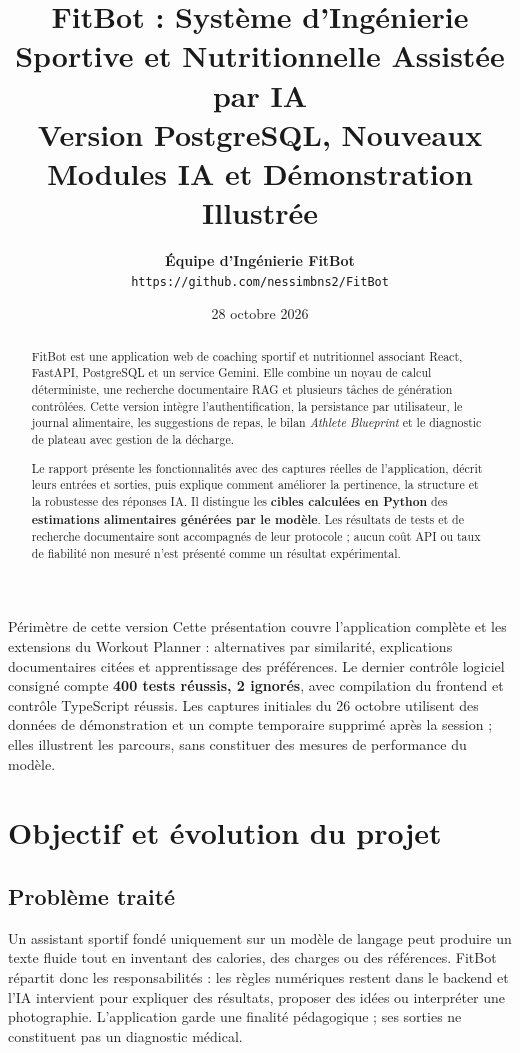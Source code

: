 \documentclass[11pt,a4paper]{article}
\title{
  \vspace{-1.0cm}
  {\Huge \textbf{\textsf{FitBot : Système d'Ingénierie Sportive et Nutritionnelle Assistée par IA}}} \\[0.5cm]
  {\Large \textbf{\textsf{Version PostgreSQL, Nouveaux Modules IA et Démonstration Illustrée}}} \\[0.7cm]
}
\author{
  \textbf{Équipe d'Ingénierie FitBot} \\
  \texttt{https://github.com/nessimbns2/FitBot}
}
\date{28 octobre 2026}
\begin{document}
\maketitle
\begin{abstract}
FitBot est une application web de coaching sportif et nutritionnel associant React, FastAPI, PostgreSQL et un service Gemini. Elle combine un noyau de calcul déterministe, une recherche documentaire RAG et plusieurs tâches de génération contrôlées. Cette version intègre l'authentification, la persistance par utilisateur, le journal alimentaire, les suggestions de repas, le bilan \textit{Athlete Blueprint} et le diagnostic de plateau avec gestion de la décharge.

Le rapport présente les fonctionnalités avec des captures réelles de l'application, décrit leurs entrées et sorties, puis explique comment améliorer la pertinence, la structure et la robustesse des réponses IA. Il distingue les \textbf{cibles calculées en Python} des \textbf{estimations alimentaires générées par le modèle}. Les résultats de tests et de recherche documentaire sont accompagnés de leur protocole ; aucun coût API ou taux de fiabilité non mesuré n'est présenté comme un résultat expérimental.
\end{abstract}
\begin{infobox}{Périmètre de cette version}
Cette présentation couvre l'application complète et les extensions du Workout Planner : alternatives par similarité, explications documentaires citées et apprentissage des préférences. Le dernier contrôle logiciel consigné compte \textbf{400 tests réussis, 2 ignorés}, avec compilation du frontend et contrôle TypeScript réussis. Les captures initiales du 26 octobre utilisent des données de démonstration et un compte temporaire supprimé après la session ; elles illustrent les parcours, sans constituer des mesures de performance du modèle.
\end{infobox}
\clearpage
\tableofcontents
\clearpage

\section{Objectif et évolution du projet}
\subsection{Problème traité}
Un assistant sportif fondé uniquement sur un modèle de langage peut produire un texte fluide tout en inventant des calories, des charges ou des références. FitBot répartit donc les responsabilités : les règles numériques restent dans le backend et l'IA intervient pour expliquer des résultats, proposer des idées ou interpréter une photographie. L'application garde une finalité pédagogique ; ses sorties ne constituent pas un diagnostic médical.
\end{document}
